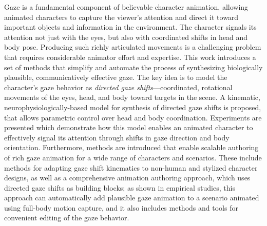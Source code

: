 Gaze is a fundamental component of believable character animation, allowing animated characters to capture the viewer's attention and direct it toward important objects and information in the environment. The character signals its attention not just with the eyes, but also with coordinated shifts in head and body pose. Producing such richly articulated movements is a challenging problem that requires considerable animator effort and expertise. This work introduces a set of methods that simplify and automate the process of synthesizing biologically plausible, communicatively effective gaze. The key idea is to model the character's gaze behavior as \emph{directed gaze shifts}---coordinated, rotational movements of the eyes, head, and body toward targets in the scene. A kinematic, neurophysiologically-based model for synthesis of directed gaze shifts is proposed, that allows parametric control over head and body coordination. Experiments are presented which demonstrate how this model enables an animated character to effectively signal its attention through shifts in gaze direction and body orientation. Furthermore, methods are introduced that enable scalable authoring of rich gaze animation for a wide range of characters and scenarios. These include methods for adapting gaze shift kinematics to non-human and stylized character designs, as well as a comprehensive animation authoring approach, which uses directed gaze shifts as building blocks; as shown in empirical studies, this approach can automatically add plausible gaze animation to a scenario animated using full-body motion capture, and it also includes methods and tools for convenient editing of the gaze behavior.
